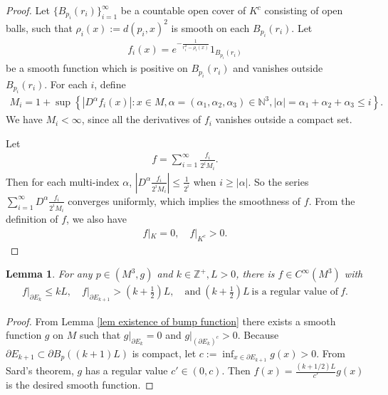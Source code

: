 \documentclass[11pt]{amsart}
\newtheorem{lemma}[theorem]{Lemma}
\numberwithin{equation}{section}
\begin{document}
\begin{proof}
    Let $\{B_{p_i}(r_i)\}_{i=1}^\infty$ be a countable open cover of $K^c$ consisting of open balls, such that $\rho_i(x):=d(p_i,x)^2$ is smooth on each $B_{p_i}(r_i)$. Let 
    \begin{align*}
        f_i(x)=e^{-\frac{1}{r_i^2-\rho_i(x)}}1_{B_{p_i}(r_i)}
    \end{align*}
    be a smooth function which is positive on $B_{p_i}(r_i)$ and vanishes outside $B_{p_i}(r_i)$. For each $i$, define 
    \begin{align*}
        M_i=1+\sup\left\{\left|D^\alpha f_i(x)\right|:x\in M, \alpha=(\alpha_1,\alpha_2,\alpha_3)\in\mathbb{N}^3, |\alpha|=\alpha_1+\alpha_2+\alpha_3\leq i\right\}.
    \end{align*}
    We have $M_i<\infty$, since all the derivatives of $f_i$ vanishes outside a compact set.

    Let
    \begin{align*}
        f=\sum_{i=1}^\infty\frac{f_i}{2^iM_i}.
    \end{align*}
    Then for each multi-index $\alpha$, $|D^\alpha\frac{f_i}{2^iM_i}|\leq \frac{1}{2^i}$ when $i\geq|\alpha|$. So the series $\sum_{i=1}^\infty D^\alpha\frac{f_i}{2^iM_i}$ converges uniformly, which implies the smoothness of $f$. From the definition of $f$, we also have 
    \begin{align*}
        f|_{K}=0,\quad f|_{K^c}>0.
    \end{align*}
\end{proof}

\begin{lemma}\label{lem function for Caccioppoli set}
{For any $p\in (M^3, g)$ and $k\in \mathbb{Z}^+, L> 0$, there is $f\in C^\infty(M^3)$ with 
\begin{align}
f\big|_{\partial E_k}\leq kL, \quad f\big|_{\partial E_{k+ 1}}> (k+ \frac{1}{2})L, \quad  \text{and} \ (k+ \frac{1}{2})L\ \text{is a regular value of} \ f. \nonumber 
\end{align}
}
\end{lemma}

\begin{proof}
    From Lemma \ref{lem existence of bump function} there exists a smooth function $g$ on $M$ such that $g|_{\partial E_k}=0$ and $g|_{(\partial E_k)^c}>0$. Because $\partial E_{k+1}\subset \partial B_p((k+1)L)$ is compact, let $\displaystyle c:=\inf_{x\in\partial E_{k+1}} g(x)>0$. From Sard's theorem, $g$ has a regular value $c'\in (0,c)$. Then $f(x)=\frac{(k+1/2)L}{c'}g(x)$ is the desired smooth function.
\end{proof}
\end{document}
